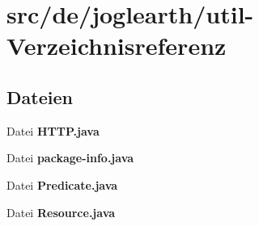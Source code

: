 \section{src/de/joglearth/util-\/\-Verzeichnisreferenz}
\label{dir_70af2fef820f118cf3bd496c4aaabd33}
\subsection*{Dateien}
\begin{DoxyCompactItemize}
\item 
Datei {\bfseries H\-T\-T\-P.\-java}
\item 
Datei {\bfseries package-\/info.\-java}
\item 
Datei {\bfseries Predicate.\-java}
\item 
Datei {\bfseries Resource.\-java}
\end{DoxyCompactItemize}
